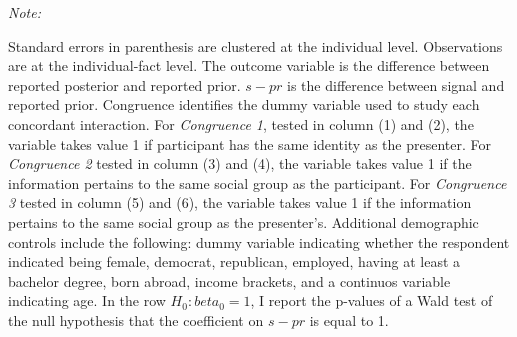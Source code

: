 \begin{table}[!h]
\begin{threeparttable}
\begin{tabular}[t]{lcccccc}
\end{tabular}
\begin{tablenotes}[para]
\item \textit{Note: } 
\item Standard errors in parenthesis are clustered at the individual level. 
            Observations are at the individual-fact level. 
            The outcome variable is the difference between reported posterior and reported prior. 
            $s - pr$ is the difference between signal and reported prior. 
            Congruence identifies the dummy variable used to study each concordant interaction. 
            For \textit{Congruence 1}, tested in column (1) and (2), the variable takes value 1 if participant has the same identity as the presenter. 
            For \textit{Congruence 2} tested in column (3) and (4), the variable takes value 1 if the information pertains to the same social group as the participant.
            For \textit{Congruence 3} tested in column (5) and (6), the variable takes value 1 if the information pertains to the same social group as the presenter's.
            Additional demographic controls include the following: dummy variable indicating whether the respondent indicated being female, democrat, republican, employed, having at least a bachelor degree, born abroad, income brackets, and a continuos variable indicating age.
            In the row $H_0: beta_0 = 1$, I report the p-values of a Wald test of the null hypothesis that the coefficient on $s - pr$ is equal to 1.
\end{tablenotes}
\end{threeparttable}
\end{table}
